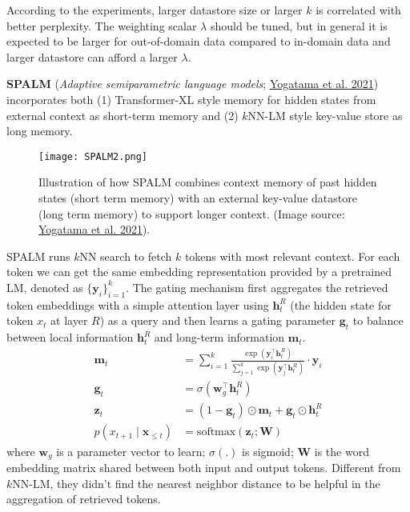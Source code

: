\documentclass[12pt]{article}
\begin{document}
According to the experiments, larger datastore size or larger $k$ is correlated with better perplexity. The weighting scalar $\lambda$ should be tuned, but in general it is expected to be larger for out-of-domain data compared to in-domain data and larger datastore can afford a larger $\lambda$.

\textbf{SPALM} (\emph{Adaptive semiparametric language models}; \href{https://arxiv.org/abs/2102.02557}{Yogatama et al. 2021}) incorporates both (1) Transformer-XL style memory for hidden states from external context as short-term memory and (2) $k$NN-LM style key-value store as long memory.

\begin{figure}[h!]
    \centering
    \texttt{[image: SPALM2.png]}
    \caption{Illustration of how SPALM combines context memory of past hidden states (short term memory) with an external key-value datastore (long term memory) to support longer context. (Image source: \href{https://arxiv.org/abs/2102.02557}{Yogatama et al. 2021}).}
\end{figure}

SPALM runs $k$NN search to fetch $k$ tokens with most relevant context. For each token we can get the same embedding representation provided by a pretrained LM, denoted as $\{\mathbf{y}_i\}_{i=1}^k$. The gating mechanism first aggregates the retrieved token embeddings with a simple attention layer using $\mathbf{h}^R_t$ (the hidden state for token $x_t$ at layer $R$) as a query and then learns a gating parameter $\mathbf{g}_t$ to balance between local information $\mathbf{h}^R_t$ and long-term information $\mathbf{m}_t$.
\[
\begin{aligned}
\mathbf{m}_t &= \sum_{i=1}^k \frac{\exp(\mathbf{y}_i^\top \mathbf{h}^R_t)}{\sum_{j=1}^k \exp(\mathbf{y}_j^\top \mathbf{h}^R_t)} \cdot \mathbf{y}_i \\
\mathbf{g}_t &= \sigma(\mathbf{w}_g^\top \mathbf{h}_t^R) \\
\mathbf{z}_t &= (1 - \mathbf{g}_t) \odot \mathbf{m}_t + \mathbf{g}_t \odot \mathbf{h}^R_t \\
p(x_{t+1}\mid \mathbf{x}_{\leq t}) &= \text{softmax}(\mathbf{z}_t; \mathbf{W})
\end{aligned}
\]
where $\mathbf{w}_g$ is a parameter vector to learn; $\sigma(.)$ is sigmoid; $\mathbf{W}$ is the word embedding matrix shared between both input and output tokens. Different from $k$NN-LM, they didn’t find the nearest neighbor distance to be helpful in the aggregation of retrieved tokens.
\end{document}
